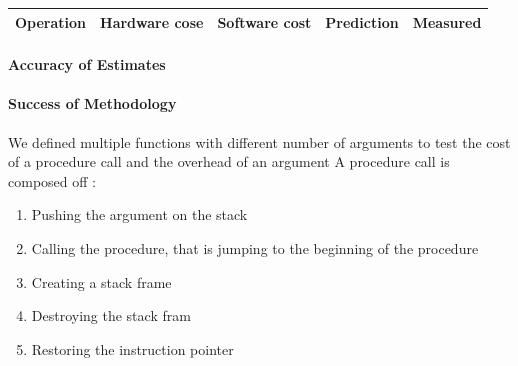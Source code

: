 \begin{tabular}{| l | l | l | l | l |}
\hline
Operation & Hardware cose & Software cost & Prediction & Measured \\
\hline
\end{tabular}
\paragraph{Accuracy of Estimates}
\paragraph{Success of Methodology}
We defined multiple functions with different number of arguments to test the
cost of a procedure call and the overhead of an argument
A procedure call is composed off :
\begin{enumerate}
\item Pushing the argument on the stack
\item Calling the procedure, that is jumping to the beginning of the procedure
\item Creating a stack frame
\item Destroying the stack fram
\item Restoring the instruction pointer
\end{enumerate}



